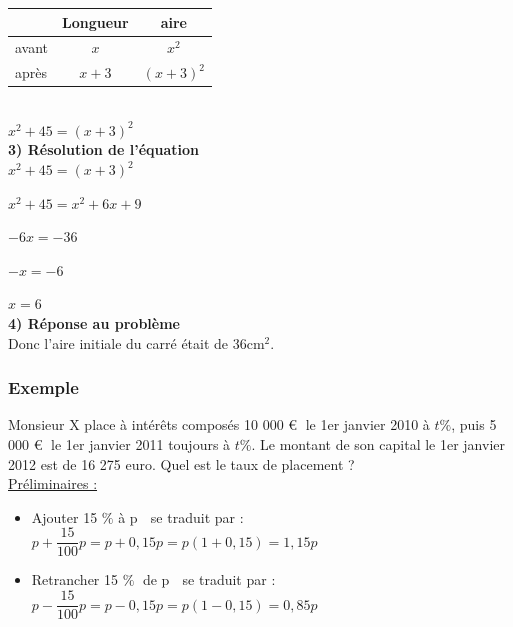\begin{tabular}{l|c|c|}
&Longueur&aire \\
\hline
avant & $x$ & $x^2$  \\
\hline
après & $x+3$ & $\left(x+3\right)^2$ \\

\end{tabular} \\

$ x^2 + 45 = \left(x+3\right)^2 $ \\

\textbf{3) Résolution de l'équation} \\

$ x^2 + 45 = \left(x+3\right)^2 $

$ x^2 + 45 = x^2 + 6x + 9 $

$ -6x = -36 $

$ -x = -6 $

$ x = 6 $ \\

\textbf{4) Réponse au problème} \\

Donc l'aire initiale du carré était de 36cm$^2$. \\

\newpage

\subsubsection{Exemple }


Monsieur X place à intérêts composés 10 000 \euro $ \; $ le 1er janvier 2010 à $ t \% $, puis 5 000 \euro $ \; $ le 1er janvier 2011 toujours à $ t\% $.
Le montant de son capital le 1er janvier 2012 est de 16 275 euro. Quel est le taux de placement ? \\

\underline{Préliminaires :} \\


\begin{itemize}

\item \og Ajouter 15 $\%$ à p \fg $ \; $ se traduit par : $ p+\dfrac{15}{100}p = p + 0,15p = p\left(1+0,15\right)= 1,15p $ \\

\item \og Retrancher 15 $\% \; $ de p \fg $\; $ se traduit par : $ p-\dfrac{15}{100}p = p - 0,15p = p\left(1-0,15\right)= 0,85p $ \\
\end{itemize}

